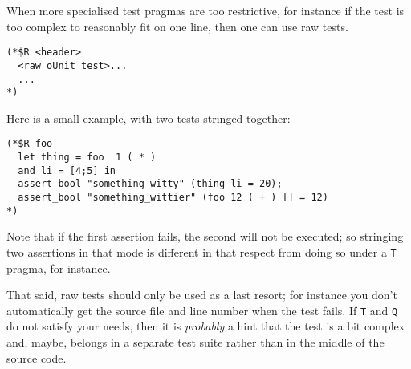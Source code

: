 
When more specialised test pragmas are too restrictive, for instance if the test is too
complex to reasonably fit on one line, then one can use raw \ounit{} tests.

\begin{verbatim}
(*$R <header>
  <raw oUnit test>...
  ...
*)
\end{verbatim}

Here is a small example, with two tests stringed together:

\begin{verbatim}
(*$R foo
  let thing = foo  1 ( * )
  and li = [4;5] in
  assert_bool "something_witty" (thing li = 20);
  assert_bool "something_wittier" (foo 12 ( + ) [] = 12)
*)
\end{verbatim}

Note that if the first assertion fails, the second will not be executed; so stringing two
assertions in that mode is different in that respect from doing so under a \texttt{T} pragma, for
instance.

That said, raw tests should only be used as a last resort; for instance you don't
automatically get the source file and line number when the test fails. If \texttt{T} and \texttt{Q} do
not satisfy your needs, then it is \emph{probably} a hint that the test is a bit complex and,
maybe, belongs in a separate test suite rather than in the middle of the source code.